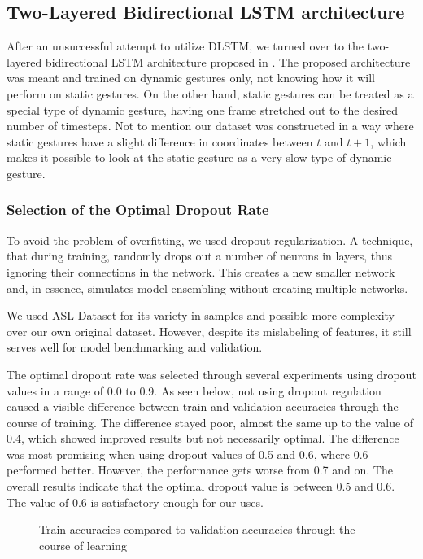 \subsection{Two-Layered Bidirectional LSTM architecture}

After an unsuccessful attempt to utilize DLSTM, we turned over to the two-layered bidirectional LSTM architecture proposed in \cite{bidirect_dynam}. The proposed architecture was meant and trained on dynamic gestures only, not knowing how it will perform on static gestures. On the other hand, static gestures can be treated as a special type of dynamic gesture, having one frame stretched out to the desired number of timesteps. Not to mention our dataset was constructed in a way where static gestures have a slight difference in coordinates between $t$ and $t+1$, which makes it possible to look at the static gesture as a very slow type of dynamic gesture.

\subsubsection{Selection of the Optimal Dropout Rate}

To avoid the problem of overfitting, we used dropout regularization. 
A technique, that during training, randomly drops out a number of neurons in layers, thus ignoring their connections in the network. This creates a new smaller network and, in essence, simulates model ensembling without creating multiple networks.

We used ASL Dataset for its variety in samples and possible more complexity over our own original dataset. However, despite its mislabeling of features, it still serves well for model benchmarking and validation.

The optimal dropout rate was selected through several experiments using dropout values in a range of 0.0 to 0.9. As seen below, not using dropout regulation caused a visible difference between train and validation accuracies through the course of training. The difference stayed poor, almost the same up to the value of 0.4, which showed improved results but not necessarily optimal. The difference was most promising when using dropout values of 0.5 and 0.6, where 0.6 performed better. However, the performance gets worse from 0.7 and on. The overall results indicate that the optimal dropout value is between 0.5 and 0.6. The value of 0.6 is satisfactory enough for our uses.

\begin{figure}[h]
    \centering
    \qquad
    \caption{Train accuracies compared to validation accuracies through the course of learning}
\end{figure}

